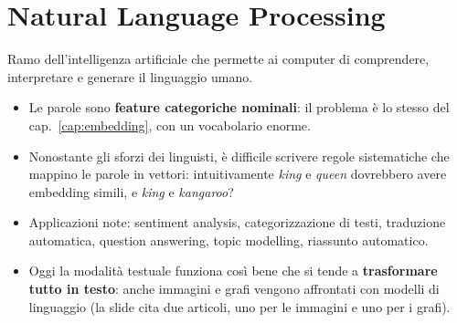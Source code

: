 \section{Natural Language Processing}
\begin{definizione}
Ramo dell'intelligenza artificiale che permette ai computer di comprendere, interpretare e generare il linguaggio umano.
\end{definizione}
\begin{itemize}
  \item Le parole sono \textbf{feature categoriche nominali}: il problema è lo stesso del cap.~\ref{cap:embedding}, con un vocabolario
        enorme.
  \item Nonostante gli sforzi dei linguisti, è difficile scrivere regole sistematiche che mappino le parole in vettori: intuitivamente
        \emph{king} e \emph{queen} dovrebbero avere embedding simili, e \emph{king} e \emph{kangaroo}?
  \item Applicazioni note: sentiment analysis, categorizzazione di testi, traduzione automatica, question answering, topic modelling,
        riassunto automatico.
  \item Oggi la modalità testuale funziona così bene che si tende a \textbf{trasformare tutto in testo}: anche immagini e grafi vengono
        affrontati con modelli di linguaggio (la slide cita due articoli, uno per le immagini e uno per i grafi).
\end{itemize}

